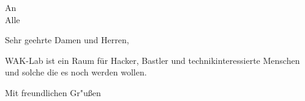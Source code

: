 \documentclass[WAK-Lab]{scrlttr2}
\begin{document}
\begin{letter}{An\\Alle}


\opening{Sehr geehrte Damen und Herren,}
WAK-Lab ist ein Raum für Hacker, Bastler und technikinteressierte Menschen und solche die es noch werden wollen.\\
\blindtext[3]

\closing{Mit freundlichen Gr"u\ss en}
\end{letter}
\end{document}

